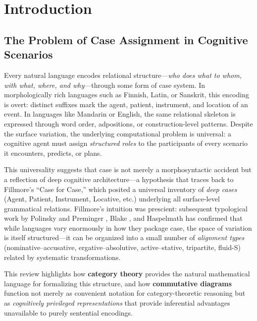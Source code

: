 \documentclass[
]{article}
\numberwithin{equation}{section}
\begin{document}
\newpage

\section{Introduction}\label{sec:introduction}

\subsection{The Problem of Case Assignment in Cognitive
Scenarios}\label{the-problem-of-case-assignment-in-cognitive-scenarios}

Every natural language encodes relational structure---\emph{who does
what to whom, with what, where, and why}---through some form of case
system. In morphologically rich languages such as Finnish, Latin, or
Sanskrit, this encoding is overt: distinct suffixes mark the agent,
patient, instrument, and location of an event. In languages like
Mandarin or English, the same relational skeleton is expressed through
word order, adpositions, or construction-level patterns. Despite the
surface variation, the underlying computational problem is universal: a
cognitive agent must assign \emph{structured roles} to the participants
of every scenario it encounters, predicts, or plans.

This universality suggests that case is not merely a morphosyntactic
accident but a reflection of deep cognitive architecture---a hypothesis
that traces back to Fillmore's \citeyearpar{fillmore1968case} ``Case for
Case,'' which posited a universal inventory of \emph{deep cases} (Agent,
Patient, Instrument, Locative, etc.) underlying all surface-level
grammatical relations. Fillmore's intuition was prescient: subsequent
typological work by Polinsky and Preminger
\citeyearpar{polinsky2015case}, Blake
\citeyearpar{blake2001grammatical}, and Haspelmath
\citeyearpar{haspelmath2009universality} has confirmed that while
languages vary enormously in how they package case, the space of
variation is itself structured---it can be organized into a small number
of \emph{alignment types} (nominative--accusative, ergative--absolutive,
active--stative, tripartite, fluid-S) related by systematic
transformations.

This review highlights how \textbf{category theory} provides the natural
mathematical language for formalizing this structure, and how
\textbf{commutative diagrams} function not merely as convenient notation
for category-theoretic reasoning but as \emph{cognitively privileged
representations} that provide inferential advantages unavailable to
purely sentential encodings.
\end{document}
